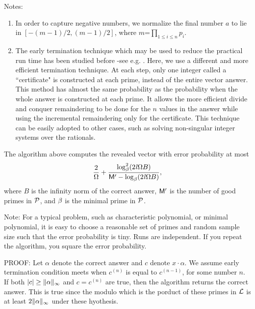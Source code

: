 Notes:
\begin{enumerate}
\item
In order to capture negative numbers, 
we normalize the final number $a$ to lie in $[-(m-1)/2, (m-1)/2]$, 
where $m$=$\prod_{1\leq i \leq n} p_i$.
\item
The early termination technique which may be used to reduce the practical run time
has been studied before -see e.g. \cite{Emiris98,Kaltofen02, Eberly03}.
Here, we use a different and more efficient termination technique.
At each step, only one integer called a ``certificate" is constructed 
at each prime, instead of the entire vector answer. This method has almost
the same probability as the probability when the whole answer is constructed at each prime.  It allows the more efficient divide and conquer remaindering
to be done for the $n$ values in the answer while using the incremental
remaindering only for the certificate.
This technique can be easily adopted to other cases,
such as solving non-singular integer systems over the rationals.
\end{enumerate}
\begin{theorem}
The algorithm above computes the revealed vector with error probability at most 
\[\frac{2}{\Omega} +
\frac{\log^2_{\beta}(2\mathit l \Omega B)}
{\mathsf M^\prime - \log_{\beta}(2\mathit l \Omega B)},\]
where $B$ is the infinity norm of the correct answer,
$\mathsf M^\prime$ is the number of good primes in $\mathcal P$,
and $\beta$ is the minimal prime in $\mathcal P$.
\end{theorem}

Note: For a typical problem, such as characteristic polynomial, 
or minimal polynomial, it is easy to choose a reasonable set of primes 
and random sample size
such that the error probability is tiny.  Runs are independent. If you
repeat the algorithm, you square the error probability.

PROOF:
Let $\alpha$ denote the correct answer and
$c$ denote $x \cdot \alpha$. 
We assume early termination condition meets when 
$c^{(n)}$ is equal to $c^{(n-1)}$, for some number $n$. 
If both $|c| \geq \|\alpha\|_\infty$ and
$c = c^{(n)}$ are true, then the algorithm returns the correct answer.
This is true since the modulo which is the porduct of these primes in $\mathcal L$ is at least 
$2 \|\alpha\|_\infty$ under these hyothesis.

